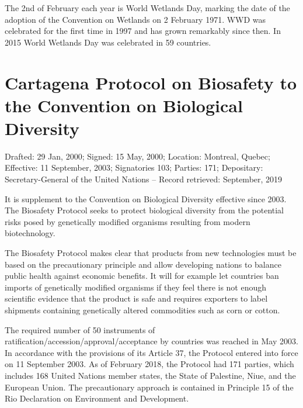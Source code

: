 \documentclass[
  openany]{book}
\begin{document}
The 2nd of February each year is World Wetlands Day, marking the date of the adoption of the Convention on Wetlands on 2 February 1971. WWD was celebrated for the first time in 1997 and has grown remarkably since then. In 2015 World Wetlands Day was celebrated in 59 countries.

\hypertarget{cartagena-protocol-on-biosafety-to-the-convention-on-biological-diversity}{%
\section{Cartagena Protocol on Biosafety to the Convention on Biological Diversity}\label{cartagena-protocol-on-biosafety-to-the-convention-on-biological-diversity}}

Drafted: 29 Jan, 2000; Signed: 15 May, 2000; Location: Montreal, Quebec; Effective: 11 September, 2003; Signatories 103; Parties: 171; Depositary: Secretary-General of the United Nations -- Record retrieved: September, 2019

It is supplement to the Convention on Biological Diversity effective since 2003. The Biosafety Protocol seeks to protect biological diversity from the potential risks posed by genetically modified organisms resulting from modern biotechnology.

The Biosafety Protocol makes clear that products from new technologies must be based on the precautionary principle and allow developing nations to balance public health against economic benefits. It will for example let countries ban imports of genetically modified organisms if they feel there is not enough scientific evidence that the product is safe and requires exporters to label shipments containing genetically altered commodities such as corn or cotton.

The required number of 50 instruments of ratification/accession/approval/acceptance by countries was reached in May 2003. In accordance with the provisions of its Article 37, the Protocol entered into force on 11 September 2003. As of February 2018, the Protocol had 171 parties, which includes 168 United Nations member states, the State of Palestine, Niue, and the European Union.
The precautionary approach is contained in Principle 15 of the Rio Declaration on Environment and Development.
\end{document}
